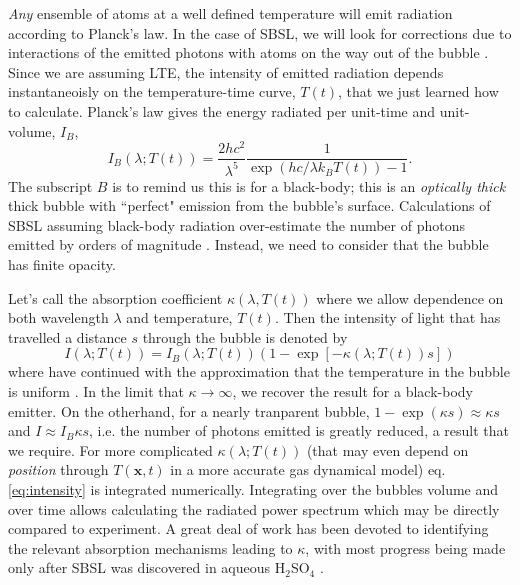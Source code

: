 \documentclass[11pt,prb,aps,nofootinbib,superscriptaddress,floatfix]{revtex4-2}
\begin{document}
\emph{Any} ensemble of atoms at a well defined temperature will emit radiation according to Planck's law. In the case of SBSL, we will look for corrections due to interactions of the emitted photons with atoms on the way out of the bubble \cite{hilgenfeldt1999sonoluminescence}. Since we are assuming LTE, the intensity of emitted radiation depends instantaneoisly on the temperature-time curve, $T(t)$, that we just learned how to calculate. Planck's law gives the energy radiated per unit-time and unit-volume, $I_B$, \cite{schroeder1999introduction}
\begin{equation}
    I_{B}(\lambda;T(t))=\frac{2 h c^2}{\lambda^5}\frac{1}{\exp(hc/\lambda k_B T(t))-1}.
\end{equation}
The subscript $B$ is to remind us this is for a black-body; this is an \emph{optically thick} thick bubble with ``perfect" emission from the bubble's surface. Calculations of SBSL assuming black-body radiation over-estimate the number of photons emitted by orders of magnitude \cite{hilgenfeldt1999simple,brenner2002single}. Instead, we need to consider that the bubble has finite opacity.

Let's call the absorption coefficient $\kappa(\lambda,T(t))$ where we allow dependence on both wavelength $\lambda$ and temperature, $T(t)$. Then the intensity of light that has travelled a distance $s$ through the bubble is denoted by \cite{zel2002physics,hilgenfeldt1999simple,taylor1969experimental}
\begin{equation}
    I(\lambda;T(t))=I_{B}(\lambda;T(t))  \left( 1-\exp \left[ -\kappa(\lambda;T(t)) s \right] \right)
    \label{eq:intensity}
\end{equation}
where have continued with the approximation that the temperature in the bubble is uniform \cite{hilgenfeldt1999sonoluminescence,hilgenfeldt1999simple}. In the limit that $\kappa\rightarrow\infty$, we recover the result for a black-body emitter. On the otherhand, for a nearly tranparent bubble, $1-\exp(\kappa s)\approx\kappa s$ and $I\approx I_B \kappa s$, i.e. the number of photons emitted is greatly reduced, a result that we require. For more complicated $\kappa(\lambda;T(t))$ (that may even depend on \emph{position} through $T(\bm{x},t)$ in a more accurate gas dynamical model) eq. \ref{eq:intensity} is integrated numerically. Integrating over the bubbles volume and over time allows calculating the radiated power spectrum which may be directly compared to experiment. A great deal of work has been devoted to identifying the relevant absorption mechanisms leading to $\kappa$, with most progress being made only after SBSL was discovered in aqueous H$_2$SO$_4$ \cite{hilgenfeldt1999simple,brenner2002single,hilgenfeldt1999sonoluminescence,yasui1999mechanism,flannigan2005plasma,flannigan2006measurement,suslick2008inside,an2009diagnosing,an2008spectral,an2006mechanism}. 
\end{document}
